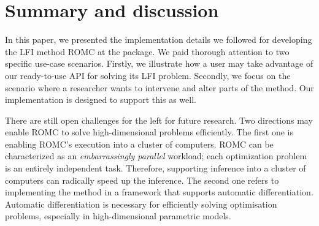 \documentclass[article]{jss}
\begin{document}
\section{Summary and discussion} \label{sec:summary}

In this paper, we presented the implementation details we followed for
developing the LFI method ROMC at the  package. We paid
thorough attention to two specific use-case scenarios. Firstly, we
illustrate how a user may take advantage of our ready-to-use API for
solving its LFI problem. Secondly, we focus on the scenario where a
researcher wants to intervene and alter parts of the method. Our
implementation is designed to support this as well.

There are still open challenges for the left for future research. Two
directions may enable ROMC to solve high-dimensional problems
efficiently. The first one is enabling ROMC's execution into a cluster
of computers. ROMC can be characterized as an \textit{embarrassingly
  parallel} workload; each optimization problem is an entirely
independent task. Therefore, supporting inference into a cluster of
computers can radically speed up the inference. The second one refers
to implementing the method in a framework that supports automatic
differentiation. Automatic differentiation is necessary for
efficiently solving optimisation problems, especially in
high-dimensional parametric models.




\end{document}
